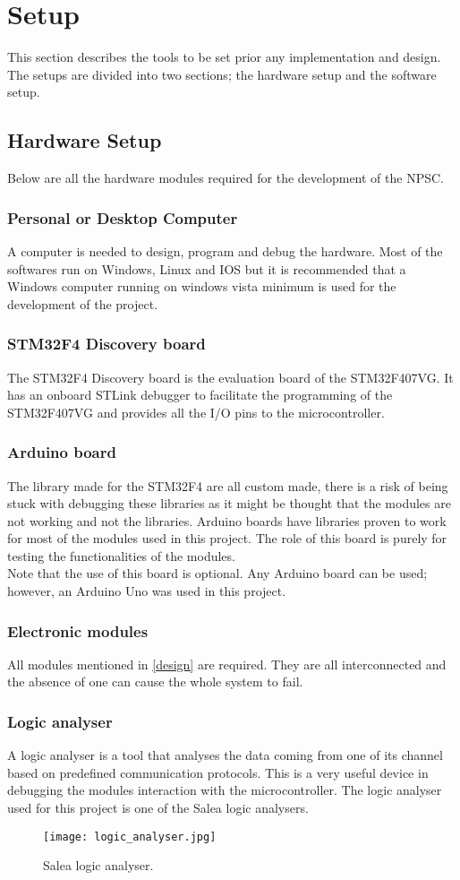 \section{Setup}
This section describes the tools to be set prior any implementation and design. The setups are divided into two sections; the hardware setup and the software setup.
\subsection{Hardware Setup}
Below are all the hardware modules required for the development of the NPSC.
\subsubsection{Personal or Desktop Computer}
A computer is needed to design, program and debug the hardware. Most of the softwares run on Windows, Linux and IOS but it is recommended that a Windows computer running on windows vista minimum is used for the development of the project. 
\subsubsection{STM32F4 Discovery board}
The STM32F4 Discovery board is the evaluation board of the STM32F407VG. It has an onboard STLink debugger to facilitate the programming of the STM32F407VG and provides all the I/O pins to the microcontroller.
\subsubsection{Arduino board}
The library made for the STM32F4 are all custom made, there is a risk of being stuck with debugging these libraries as it might be thought that the modules are not working and not the libraries. Arduino boards have libraries proven to work for most of the modules used in this project. The role of this board is purely for testing the functionalities of the modules.\\
Note that the use of this board is optional. Any Arduino board can be used; however, an Arduino Uno was used in this project. 
\subsubsection{Electronic modules}
All modules mentioned in \cref{design} are required. They are all interconnected and the absence of one can cause the whole system to fail.
\subsubsection{Logic analyser}\label{logic_analyser}
A logic analyser is a tool that analyses the data coming from one of its channel based on predefined communication protocols. This is a very useful device in debugging the modules interaction with the microcontroller. The logic analyser used for this project is one of the Salea logic analysers.
\begin{figure}[ht]
\centering
\texttt{[image: logic\_analyser.jpg]}
\caption{Salea logic analyser.}
\label{fig:logic_analyser}
\end{figure}
